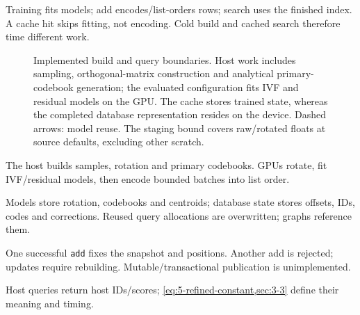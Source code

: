 Training fits models; add encodes/list-orders rows; search uses the finished index. A cache hit skips fitting, not encoding. Cold build and cached search therefore time different work.

\begin{figure}[tbp]
\centering

\caption[Build and query architecture]{Implemented build and query boundaries. Host work includes
sampling, orthogonal-matrix construction and analytical primary-codebook
generation; the evaluated configuration fits IVF and residual models on
the GPU. The cache stores trained state, whereas the completed database
representation resides on the device. Dashed arrows: model reuse. The staging bound covers raw/rotated floats at source defaults, excluding other scratch.}
\label{fig:4-architecture}
\end{figure}

The host builds samples, rotation and primary codebooks. GPUs rotate, fit IVF/residual models, then encode bounded batches into list order.

Models store rotation, codebooks and centroids; database state stores offsets, IDs, codes and corrections. Reused query allocations are overwritten; graphs reference them.

One successful \texttt{add} fixes the snapshot and positions. Another add is rejected; updates require rebuilding. Mutable/transactional publication is unimplemented.

Host queries return host IDs/scores; \cref{eq:5-refined-constant,sec:3-3} define their meaning and timing.

